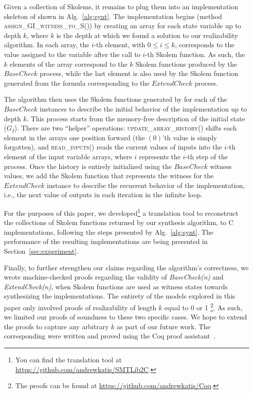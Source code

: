 Given a collection of Skolems, it remains to plug them into an implementation skeleton of
 shown in Alg.~\ref{alg:synt}.
The implementation begins (method \textsc{assign\_GI\_witness\_to\_S()}) by
creating an array for each state variable up to depth $k$, where $k$ is the
depth at which we found a solution to our realizability algorithm.
In each array, the $i$-th element, with $0\leq i \leq k$, corresponds to the
value assigned to the variable after the call to $i$-th Skolem function. As
such, the $k$ elements of the array correspond to the $k$ Skolem
functions produced by the $\mathit{BaseCheck}$ process, while the last element
is also used by the Skolem function generated from the formula corresponding to
the $\mathit{ExtendCheck}$ process.

The algorithm then uses the Skolem functions generated by \aeval for each
of the $\mathit{BaseCheck}$ instances to describe the initial behavior of
the implementation up to depth $k$.  This process starts from the memory-free
description of the initial state ($G_I$). 
There are two ``helper'' operations:
\textsc{update\_array\_history()} shifts each element in the arrays one position forward
(the $(0)$'th value is simply forgotten), and \textsc{read\_inputs()} reads the
current values of inputs into the $i$-th element of the input variable arrays,
where $i$ represents the $i$-th step of the process.
Once the history is entirely initialized using the $\mathit{BaseCheck}$ witness values,
we add the Skolem function that represents the witness for the
$\mathit{ExtendCheck}$ instance to describe the recurrent behavior of the implementation, i.e.,
the next value of outputs in each iteration in the infinite loop.

For the purposes of this paper, we developed\footnote{You can find the translation tool at
\url{https://github.com/andrewkatis/SMTLib2C}.} a translation tool to reconstruct
the collections of Skolem functions returned by our synthesis algorithm, to C
implementations, following the steps presented by
Alg.~\ref{alg:synt}. The performance of the resulting implementations are
being presented in Section~\ref{sec:experiment}.

Finally, to further strengthen our claims regarding the algorithm's
correctness, we wrote machine-checked proofs regarding the validity of \textit{BaseCheck(n)} and
\textit{ExtendCheck(n)}, when Skolem functions are used as witness states
towards synthesizing the implementations. The entirety of the models explored in
this paper only involved proofs of realizability of length $k$ equal to 0 or
1%
\footnote{The proofs can be found at \url{https://github.com/andrewkatis/Coq}.}.
As such, we limited our proofs of soundness to these two specific cases. We hope
to extend the proofs to capture any arbitrary $k$ as part of our future work.
The corresponding were written and proved using the Coq proof
assistant~\cite{Coqmanual}.

